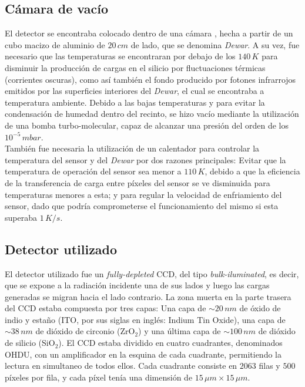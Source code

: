 \subsection{Cámara de vacío}
\noindent El detector se encontraba colocado dentro de una cámara%
, hecha a partir de un cubo macizo de aluminio de $20\,\si{cm}$ de lado, que se denomina \textit{Dewar}. A su vez, fue necesario que las temperaturas se encontraran por debajo de los $140\,\si{K}$ para disminuir la producción de cargas en el silicio por fluctuaciones térmicas (corrientes oscuras), como así también el fondo producido por fotones infrarrojos emitidos por las superficies interiores del \textit{Dewar}, el cual se encontraba a temperatura ambiente. Debido a las bajas temperaturas y para evitar la condensación de humedad dentro del recinto, se hizo vacío mediante la utilización de una bomba turbo-molecular, capaz de alcanzar una presión del orden de los $10^{-5}\,\si{mbar}$.\\
\indent También fue necesaria la utilización de un calentador para controlar la temperatura del sensor y del \textit{Dewar} por dos razones principales: Evitar que la temperatura de operación del sensor sea menor a $110\,\si{K}$, debido a que la eficiencia de la transferencia de carga entre píxeles del sensor se ve disminuida para temperaturas menores a esta; y para regular la velocidad de enfriamiento del sensor, dado que podría comprometerse el funcionamiento del mismo si esta superaba $1\,\si{K/s}$.\\
\subsection{Detector utilizado}
\noindent El detector utilizado fue un \textit{fully-depleted} CCD, del tipo \textit{bulk-iluminated}, es decir, que se expone a la radiación incidente una de sus lados y luego las cargas generadas se migran hacia el lado contrario. La zona muerta en la parte trasera del CCD estaba compuesta por tres capas: Una capa de $\sim 20\,\si{nm}$ de óxido de indio y estaño (ITO, por sus siglas en inglés: Indium Tin Oxide), una capa de $\sim 38\,\si{nm}$ de dióxido de circonio (ZrO$_{2}$) y una última capa de $\sim 100\,\si{nm}$ de dióxido de silicio (SiO$_{2}$). El CCD estaba dividido en cuatro cuadrantes, denominados OHDU, con un amplificador en la esquina de cada cuadrante, permitiendo la lectura en simultaneo de todos ellos. Cada cuadrante consiste en $2063$ filas y $500$ píxeles por fila, y cada píxel tenía una dimensión de $15\,\si{\mu m} \times 15\,\si{\mu m}$.
